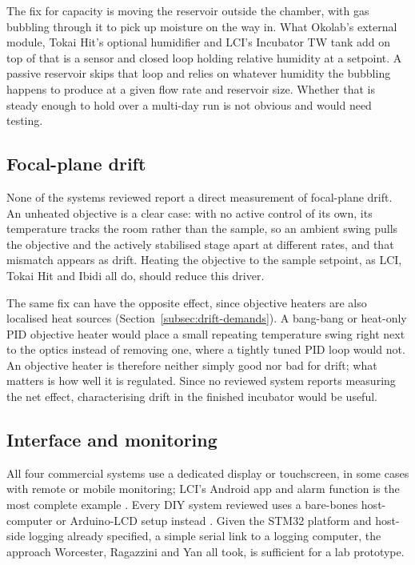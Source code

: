 The fix for capacity is moving the reservoir outside the chamber, with gas bubbling through it to pick up moisture on the way in. What Okolab's external module, Tokai Hit's optional humidifier and LCI's Incubator TW tank add on top of that is a sensor and closed loop holding relative humidity at a setpoint. A passive reservoir skips that loop and relies on whatever humidity the bubbling happens to produce at a given flow rate and reservoir size. Whether that is steady enough to hold over a multi-day run is not obvious and would need testing.

\subsection{Focal-plane drift}
\label{subsec:existing-drift}

None of the systems reviewed report a direct measurement of focal-plane drift. An unheated objective is a clear case: with no active control of its own, its temperature tracks the room rather than the sample, so an ambient swing pulls the objective and the actively stabilised stage apart at different rates, and that mismatch appears as drift. Heating the objective to the sample setpoint, as LCI, Tokai Hit and Ibidi all do, should reduce this driver.

The same fix can have the opposite effect, since objective heaters are also localised heat sources (Section~\ref{subsec:drift-demands}). A bang-bang or heat-only PID objective heater would place a small repeating temperature swing right next to the optics instead of removing one, where a tightly tuned PID loop would not. An objective heater is therefore neither simply good nor bad for drift; what matters is how well it is regulated. Since no reviewed system reports measuring the net effect, characterising drift in the finished incubator would be useful.

\subsection{Interface and monitoring}
\label{subsec:existing-interface}

All four commercial systems use a dedicated display or touchscreen, in some cases with remote or mobile monitoring; LCI's Android app and alarm function is the most complete example \citep{noauthor_incubator_2021,okolab_stagetop_bl3,noauthor_tokai_nodate}. Every DIY system reviewed uses a bare-bones host-computer or Arduino-LCD setup instead \citep{worcester_low-cost_2025,ragazzini_fabrication_2019,yan_establishment_2024,ocarroll_thermocyte_nodate}. Given the STM32 platform and host-side logging already specified, a simple serial link to a logging computer, the approach Worcester, Ragazzini and Yan all took, is sufficient for a lab prototype.

